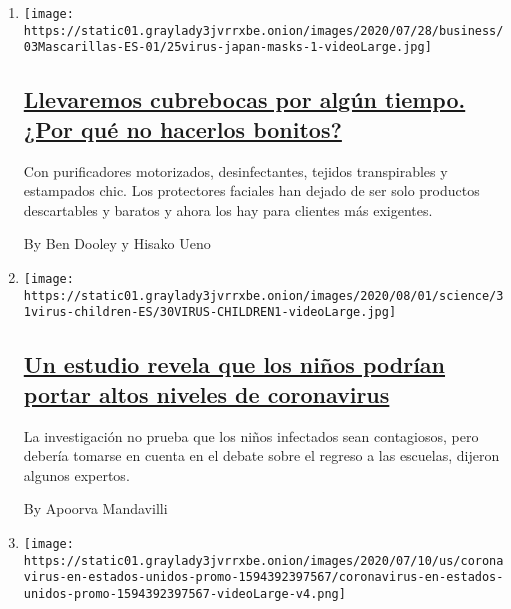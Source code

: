 \begin{enumerate}
\def\labelenumi{\arabic{enumi}.}
\item
  \texttt{[image: https://static01.graylady3jvrrxbe.onion/images/2020/07/28/business/03Mascarillas-ES-01/25virus-japan-masks-1-videoLarge.jpg]}

  \hypertarget{llevaremos-cubrebocas-por-alguxfan-tiempo-por-quuxe9-no-hacerlos-bonitos}{%
  \subsection{\texorpdfstring{\href{/es/2020/08/04/espanol/negocios/japon-cubrebocas.html}{Llevaremos
  cubrebocas por algún tiempo. ¿Por qué no hacerlos
  bonitos?}}{Llevaremos cubrebocas por algún tiempo. ¿Por qué no hacerlos bonitos?}}\label{llevaremos-cubrebocas-por-alguxfan-tiempo-por-quuxe9-no-hacerlos-bonitos}}

  Con purificadores motorizados, desinfectantes, tejidos transpirables y
  estampados chic. Los protectores faciales han dejado de ser solo
  productos descartables y baratos y ahora los hay para clientes más
  exigentes.

  By Ben Dooley y Hisako Ueno
\item
  \texttt{[image: https://static01.graylady3jvrrxbe.onion/images/2020/08/01/science/31virus-children-ES/30VIRUS-CHILDREN1-videoLarge.jpg]}

  \hypertarget{un-estudio-revela-que-los-niuxf1os-podruxedan-portar-altos-niveles-de-coronavirus}{%
  \subsection{\texorpdfstring{\href{/es/2020/07/31/espanol/ciencia-y-tecnologia/ninos-contagio-coronavirus.html}{Un
  estudio revela que los niños podrían portar altos niveles de
  coronavirus}}{Un estudio revela que los niños podrían portar altos niveles de coronavirus}}\label{un-estudio-revela-que-los-niuxf1os-podruxedan-portar-altos-niveles-de-coronavirus}}

  La investigación no prueba que los niños infectados sean contagiosos,
  pero debería tomarse en cuenta en el debate sobre el regreso a las
  escuelas, dijeron algunos expertos.

  By Apoorva Mandavilli
\item
  \texttt{[image: https://static01.graylady3jvrrxbe.onion/images/2020/07/10/us/coronavirus-en-estados-unidos-promo-1594392397567/coronavirus-en-estados-unidos-promo-1594392397567-videoLarge-v4.png]}


\end{enumerate}
